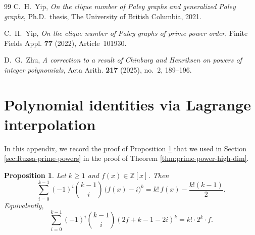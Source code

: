 \documentclass[12pt,reqno]{amsart}
\theoremstyle{plain}
\newtheorem{proposition}[theorem]{Proposition}
\theoremstyle{definition}
\newcommand{\1}{\mathbf{1}}
\begin{document}
\begin{thebibliography}{99}
C.~H.~Yip,
\newblock \emph{On the clique number of Paley graphs and generalized Paley graphs},
\newblock Ph.D.\ thesis, The University of British Columbia, 2021.

C.~H.~Yip,
\newblock \emph{On the clique number of Paley graphs of prime power order},
\newblock Finite Fields Appl. \textbf{77} (2022), Article~101930.

D.~G.~Zhu,
\newblock \emph{A correction to a result of Chinburg and Henriksen on powers of integer polynomials},
\newblock Acta Arith. \textbf{217} (2025), no.~2, 189--196.

\end{thebibliography}

\appendix
\section{Polynomial identities via Lagrange interpolation}\label{app:binomial-alternating-sum}

In this appendix, we record the proof of Proposition \ref{prop:shifted-kth-power-sum} that we used in Section \ref{sec:Ruzsa-prime-powers} in the proof of Theorem \ref{thm:prime-power-high-dim}. 

\begin{proposition}\label{prop:shifted-kth-power-sum}
Let $k\ge 1$ and $f(x)\in \mathbb{Z}[x]$. Then
\begin{equation}\label{eq:main-identity}
\sum_{i=0}^{k-1}(-1)^i\binom{k-1}{i}\,\bigl(f(x)-i\bigr)^k
= k!\,f(x)-\frac{k!(k-1)}{2}.
\end{equation}
Equivalently,
\[
\sum_{i = 0}^{k - 1} (-1)^i \binom{k - 1}{i} \left(2f + k-1 - 2i\right)^k = k! \cdot 2^{k} \cdot f.
\]
\end{proposition}
\end{document}
